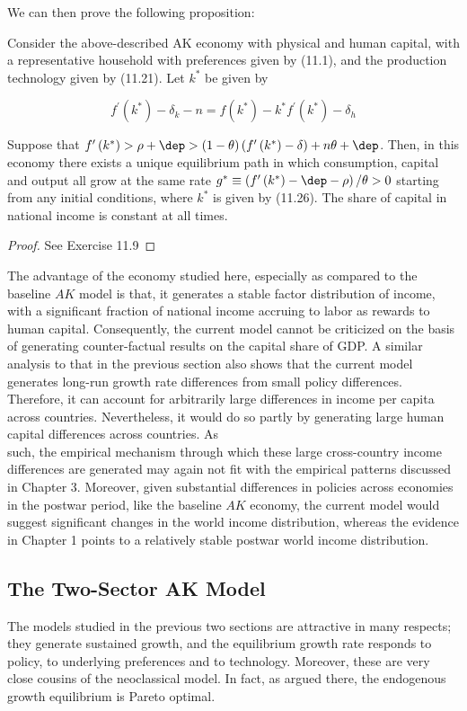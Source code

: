 \documentclass[\topdir/lecture\_notes.tex]{subfiles}
\begin{document}
We can then prove the following proposition:
\begin{proposition}
Consider the above-described AK economy with physical and human capital, with a representative household with preferences given by (11.1), and the production technology given by (11.21). Let $k^*$ be given by

\[
f^{\prime}\left(k^{*}\right)-\delta_{k}-n=f\left(k^{*}\right)-k^{*} f^{\prime}\left(k^{*}\right)-\delta_{h}
\]

Suppose that $f'\left(k^*\right)>\rho+\dep>(1-\theta)\left(f'\left(k^*\right)-\delta\right)+n \theta+\dep$. Then, in this economy there exists a unique equilibrium path in which consumption, capital and output all grow at the same rate $g^* \equiv\left(f'\left(k^*\right)-\dep-\rho\right) / \theta>0$ starting from any initial conditions, where $k^*$ is given by (11.26). The share of capital in national income is constant at all times.
\end{proposition}
\begin{proof}
See Exercise 11.9
\end{proof}
The advantage of the economy studied here, especially as compared to the baseline $AK$ model is that, it generates a stable factor distribution of income, with a significant fraction of national income accruing to labor as rewards to human capital. Consequently, the current model cannot be criticized on the basis of generating counter-factual results on the capital share of GDP. A similar analysis to that in the previous section also shows that the current model generates long-run growth rate differences from small policy differences. Therefore, it can account for arbitrarily large differences in income per capita across countries. Nevertheless, it would do so partly by generating large human capital differences across countries. As\\
such, the empirical mechanism through which these large cross-country income differences are generated may again not fit with the empirical patterns discussed in Chapter 3. Moreover, given substantial differences in policies across economies in the postwar period, like the baseline $AK$ economy, the current model would suggest significant changes in the world income distribution, whereas the evidence in Chapter 1 points to a relatively stable postwar world income distribution.

\subsection{The Two-Sector AK Model}
The models studied in the previous two sections are attractive in many respects; they generate sustained growth, and the equilibrium growth rate responds to policy, to underlying preferences and to technology. Moreover, these are very close cousins of the neoclassical model. In fact, as argued there, the endogenous growth equilibrium is Pareto optimal.
\end{document}
